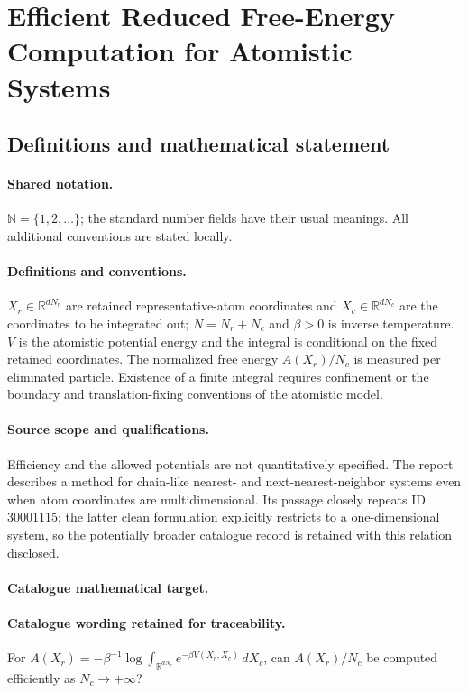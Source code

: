 \documentclass[11pt]{article}
\begin{document}
\section{Efficient Reduced Free-Energy Computation for Atomistic Systems}\label{statement}

\subsection{Definitions and mathematical statement}

\paragraph{Shared notation.}$\mathbb N=\{1,2,\ldots\}$; the standard number fields have their usual meanings. All additional conventions are stated locally.


\paragraph{Definitions and conventions.} $X_r\in\mathbb R^{dN_r}$ are retained representative-atom coordinates and $X_c\in\mathbb R^{dN_c}$ are the coordinates to be integrated out; $N=N_r+N_c$ and $\beta>0$ is inverse temperature. $V$ is the atomistic potential energy and the integral is conditional on the fixed retained coordinates. The normalized free energy $A(X_r)/N_c$ is measured per eliminated particle. Existence of a finite integral requires confinement or the boundary and translation-fixing conventions of the atomistic model.

\paragraph{Source scope and qualifications.} Efficiency and the allowed potentials are not quantitatively specified. The report describes a method for chain-like nearest- and next-nearest-neighbor systems even when atom coordinates are multidimensional. Its passage closely repeats ID 30001115; the latter clean formulation explicitly restricts to a one-dimensional system, so the potentially broader catalogue record is retained with this relation disclosed.

\paragraph{Catalogue mathematical target.}
\paragraph{Catalogue wording retained for traceability.}
For $A(X_r)=-\beta^{-1}\log\int_{\mathbb R^{dN_c}}e^{-\beta V(X_r,X_c)}\,dX_c$, can $A(X_r)/N_c$ be computed efficiently as $N_c\to+\infty$?
\end{document}

